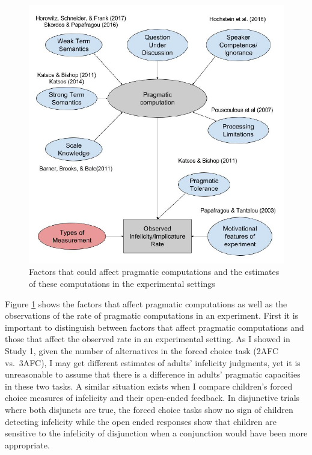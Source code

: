 \documentclass[man]{apa6}
\theoremstyle{definition}
\theoremstyle{definition}
\theoremstyle{definition}
\theoremstyle{remark}
\begin{document}
\begin{figure}[t]

{\centering \includegraphics{figs/implicatureGraph-1} 

}

\caption{Factors that could affect pragmatic computations and the estimates of these computations in the experimental settings}\label{fig:implicatureGraph}
\end{figure}

Figure \ref{fig:implicatureGraph} shows the factors that affect
pragmatic computations as well as the observations of the rate of
pragmatic computations in an experiment. First it is important to
distinguish between factors that affect pragmatic computations and those
that affect the observed rate in an experimental setting. As I showed in
Study 1, given the number of alternatives in the forced choice task
(2AFC vs.~3AFC), I may get different estimates of adults' infelicity
judgments, yet it is unreasonable to assume that there is a difference
in adults' pragmatic capacities in these two tasks. A similar situation
exists when I compare children's forced choice measures of infelicity
and their open-ended feedback. In disjunctive trials where both
disjuncts are true, the forced choice tasks show no sign of children
detecting infelicity while the open ended responses show that children
are sensitive to the infelicity of disjunction when a conjunction would
have been more appropriate.
\end{document}
